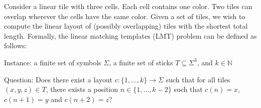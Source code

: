 Consider a linear tile with three cells. Each cell contains one color. Two
tiles can overlap wherever the cells have the same color. Given a set of tiles,
we wish to compute the linear layout of (possibly overlapping) tiles with the
shortest total length. Formally, the linear matching templates (LMT) problem
can be defined as follows:

\begin{shaded}
\begin{definition}\mbox{}

  Instance: a finite set of symbols $\Sigma$, a finite set of sticks
  $T\subseteq\Sigma^3$, and $k\in\mathbb{N}$

  Question: Does there exist a layout $c\colon\{1,\ldots,k\}\to\Sigma$ such
  that for all tiles $(x, y, z)\in T$, there exists a position
  $n\in\{1,\ldots,k-2\}$ such that $c(n)=x$, $c(n+1)=y$ and $c(n+2)=z$?
\end{definition}
\end{shaded}
